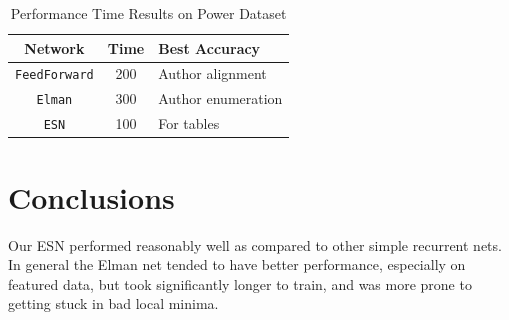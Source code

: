 \documentclass{acm_proc_article-sp}
\begin{document}
\begin{table}
\centering
\caption{Performance Time Results on Power Dataset}
\begin{tabular}{|c|c|l|} \hline
Network&Time&Best Accuracy\\ \hline
\texttt{FeedForward} & 200& Author alignment\\ \hline
\texttt{Elman}& 300& Author enumeration\\ \hline
\texttt{ESN}& 100 & For tables\\ \hline
\end{tabular}
\end{table}

\section{Conclusions}
Our ESN performed reasonably well as compared to other simple recurrent nets. In general the Elman net tended to have better performance, especially on featured data, but took significantly longer to train, and was more prone to getting stuck in bad local minima.




\balancecolumns
\end{document}
